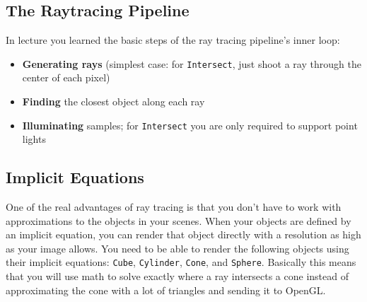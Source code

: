 \documentclass[10pt,twocolumn]{article}
\begin{document}
\subsection{The Raytracing Pipeline}
In lecture you learned the basic steps of the ray tracing pipeline's inner loop:
\begin{itemize}
	\item {\bf Generating rays} (simplest case: for {\tt Intersect}, just shoot a ray through the center of each pixel)
	\item {\bf Finding} the closest object along each ray
	\item {\bf Illuminating} samples; for {\tt Intersect} you are only required to support point lights
\end{itemize}

\subsection{Implicit Equations}
One of the real advantages of ray tracing is that you don't have to work with approximations to the objects in your scenes. When your objects are defined by an implicit equation, you can render that object directly with a resolution as high as your image allows. You need to be able to render the following objects using their implicit equations: {\tt Cube}, {\tt Cylinder}, {\tt Cone}, and {\tt Sphere}. Basically this means that you will use math to solve exactly where a ray intersects a cone instead of approximating the cone with a lot of triangles and sending it to OpenGL.
\end{document}
